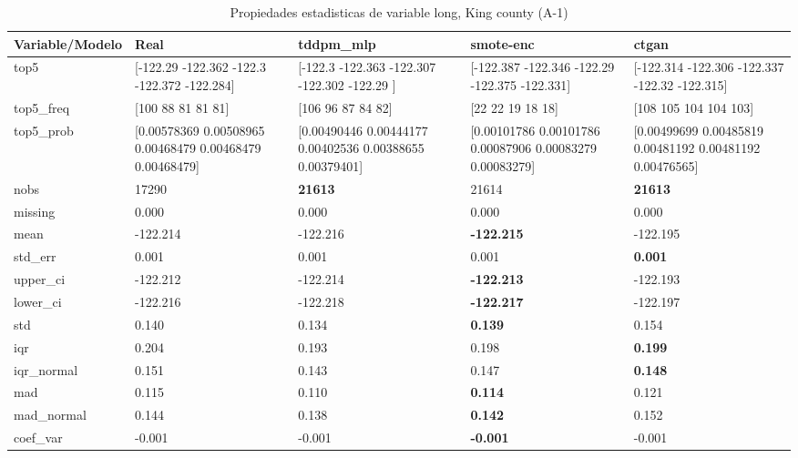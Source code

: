 \begin{table}[H]
\centering
\fontsize{8}{14}\selectfont
\caption{Propiedades  estadisticas de variable long, King county (A-1)}
\label{table-stats-king county-a-1-long}
\begin{tabular}{|l|m{10em}|m{10em}|m{10em}|m{10em}|}
\hline
 \rowcolor[gray]{0.8}
Variable/Modelo & Real & tddpm\_mlp & smote-enc & ctgan \\
\hline top5 & [-122.29  -122.362 -122.3   -122.372 -122.284] & [-122.3   -122.363 -122.307 -122.302 -122.29 ] & [-122.387 -122.346 -122.29  -122.375 -122.331] & [-122.314 -122.306 -122.337 -122.32  -122.315] \\
\hline top5\_freq & [100  88  81  81  81] & [106  96  87  84  82] & [22 22 19 18 18] & [108 105 104 104 103] \\
\hline top5\_prob & [0.00578369 0.00508965 0.00468479 0.00468479 0.00468479] & [0.00490446 0.00444177 0.00402536 0.00388655 0.00379401] & [0.00101786 0.00101786 0.00087906 0.00083279 0.00083279] & [0.00499699 0.00485819 0.00481192 0.00481192 0.00476565] \\
\hline nobs & 17290 & \bfseries 21613 & \cellcolor[rgb]{0.9, 0.54, 0.52} 21614 & \bfseries 21613 \\
\hline missing & 0.000 & 0.000 & 0.000 & 0.000 \\
\hline mean & -122.214 & -122.216 & \bfseries -122.215 & \cellcolor[rgb]{0.9, 0.54, 0.52} -122.195 \\
\hline std\_err & 0.001 & \cellcolor[rgb]{0.9, 0.54, 0.52} 0.001 & 0.001 & \bfseries 0.001 \\
\hline upper\_ci & -122.212 & -122.214 & \bfseries -122.213 & \cellcolor[rgb]{0.9, 0.54, 0.52} -122.193 \\
\hline lower\_ci & -122.216 & -122.218 & \bfseries -122.217 & \cellcolor[rgb]{0.9, 0.54, 0.52} -122.197 \\
\hline std & 0.140 & 0.134 & \bfseries 0.139 & \cellcolor[rgb]{0.9, 0.54, 0.52} 0.154 \\
\hline iqr & 0.204 & \cellcolor[rgb]{0.9, 0.54, 0.52} 0.193 & 0.198 & \bfseries 0.199 \\
\hline iqr\_normal & 0.151 & \cellcolor[rgb]{0.9, 0.54, 0.52} 0.143 & 0.147 & \bfseries 0.148 \\
\hline mad & 0.115 & 0.110 & \bfseries 0.114 & \cellcolor[rgb]{0.9, 0.54, 0.52} 0.121 \\
\hline mad\_normal & 0.144 & 0.138 & \bfseries 0.142 & \cellcolor[rgb]{0.9, 0.54, 0.52} 0.152 \\
\hline coef\_var & -0.001 & -0.001 & \bfseries -0.001 & \cellcolor[rgb]{0.9, 0.54, 0.52} -0.001 \\

\end{tabular}
\end{table}
